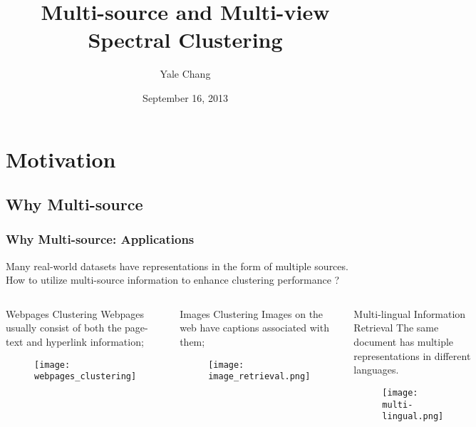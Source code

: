 \documentclass{beamer}
\title{Multi-source and Multi-view Spectral Clustering}
\author{Yale Chang}
\institute{Northeastern University}
\date{September 16, 2013}
\begin{document}
\begin{frame}
	\titlepage
\end{frame}


\tableofcontents

\section{Motivation}
\subsection{Why Multi-source}

\begin{frame}
\frametitle{Why Multi-source: Applications}
\begin{block}{}
Many real-world datasets have representations in the form of multiple sources.
How to utilize multi-source information to enhance clustering performance ?
\end{block}
	\begin{columns}
		\begin{exampleblock}{Webpages Clustering}
		Webpages usually consist of both the page-text and hyperlink information;
		\begin{figure}
			\texttt{[image: webpages\_clustering]}
		\end{figure}
		\end{exampleblock}
		\begin{exampleblock}{Images Clustering}
		Images on the web have captions associated with them;
		\begin{figure}
			\texttt{[image: image\_retrieval.png]}
		\end{figure}
		\end{exampleblock}
		\begin{exampleblock}{Multi-lingual Information Retrieval}
		The same document has multiple representations in different languages.
		\begin{figure}
			\texttt{[image: multi-lingual.png]}
		\end{figure}
		\end{exampleblock}
	\end{columns}
\end{frame}
\end{document}
